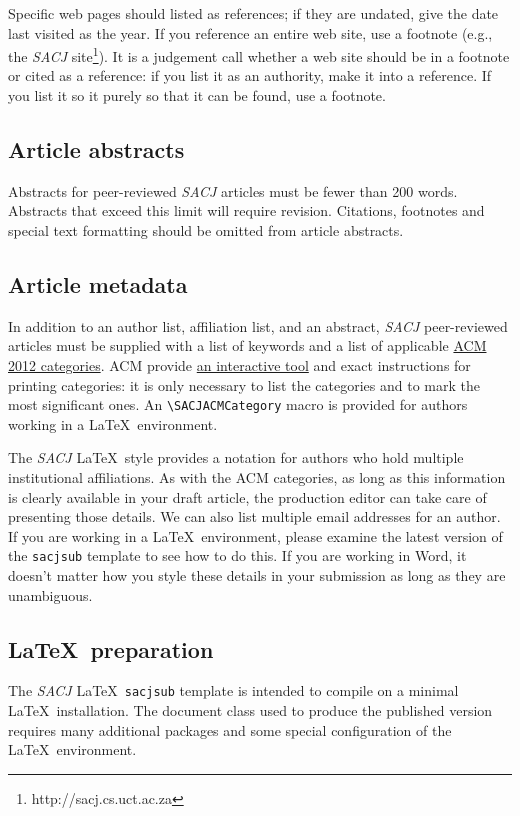 \documentclass[submission]{sacjsub}
\begin{document}
Specific web pages should listed as references; if they are undated, give the date last visited as the year.  If you reference an entire web site, use a footnote (e.g., the {\em SACJ} site\footnote{http://sacj.cs.uct.ac.za}). It is a judgement call whether a web site should be in a footnote or cited as a reference: if you list it as an authority, make it into a reference. If you list it so it purely so that it can be found, use a footnote.

\subsection{Article abstracts}
Abstracts for peer-reviewed {\em SACJ} articles must be fewer than 200 words. Abstracts that exceed this limit will require revision. Citations, footnotes and special text formatting should be omitted from article abstracts.

\subsection{Article metadata}
In addition to an author list, affiliation list, and an abstract, {\em SACJ} peer-reviewed articles must be supplied with a list of keywords and a list of applicable \href{https://dl.acm.org/ccs/ccs.cfm?}{ACM 2012 categories}. ACM provide \href{http://dl.acm.org/ccs/ccs.cfm}{an interactive tool} and exact instructions for printing categories: it is only necessary to list the categories and to mark the most significant ones. An \verb"\SACJACMCategory" macro is provided for authors working in a \LaTeX~environment. 

The {\em SACJ} \LaTeX~style provides a notation for authors who hold multiple institutional affiliations. As with the ACM categories, as long as this information is clearly available in your draft article, the production editor can take care of presenting those details. We can also list multiple email addresses for an author. If you are working in a \LaTeX~environment, please examine the latest version of the \verb"sacjsub" template to see how to do this. If you are working in Word, it doesn't matter how you style these details in your submission as long as they are unambiguous. 

\subsection{\LaTeX~preparation}
The {\em SACJ} \LaTeX~\verb"sacjsub" template is intended to compile on a minimal \LaTeX~installation. The document class used to produce the published version requires many additional packages and some special configuration of the \LaTeX~environment.
\end{document}
